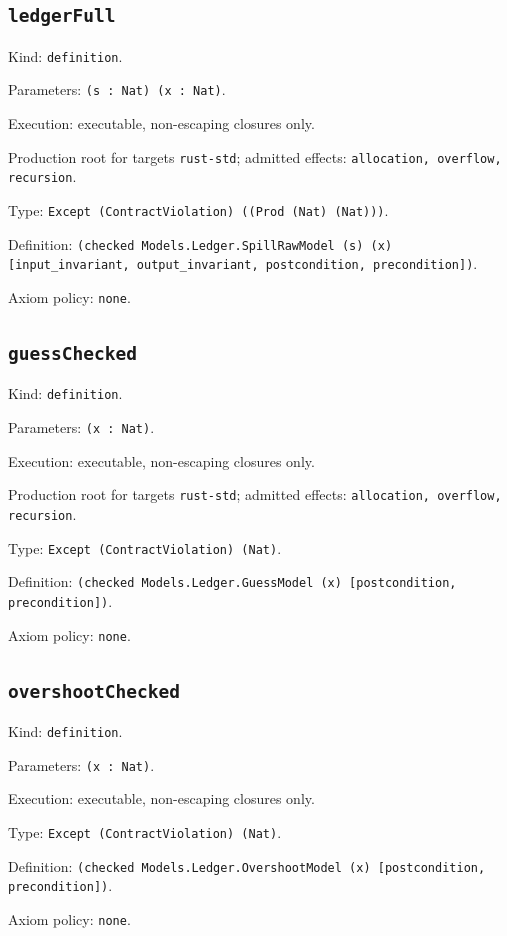 \documentclass[11pt]{article}
\begin{document}
\subsection*{\texttt{ledgerFull}}
\noindent Kind: \texttt{definition}.\par
\noindent Parameters: \texttt{(s : Nat) (x : Nat)}.\par
\noindent Execution: executable, non-escaping closures only.\par
\noindent Production root for targets \texttt{rust-std}; admitted effects: \texttt{allocation, overflow, recursion}.\par
\noindent Type: \texttt{Except (ContractViolation) ((Prod (Nat) (Nat)))}.\par
\noindent Definition: \texttt{(checked Models.Ledger.SpillRawModel (s) (x) [input\_invariant, output\_invariant, postcondition, precondition])}.\par
\noindent Axiom policy: \texttt{none}.\par
\subsection*{\texttt{guessChecked}}
\noindent Kind: \texttt{definition}.\par
\noindent Parameters: \texttt{(x : Nat)}.\par
\noindent Execution: executable, non-escaping closures only.\par
\noindent Production root for targets \texttt{rust-std}; admitted effects: \texttt{allocation, overflow, recursion}.\par
\noindent Type: \texttt{Except (ContractViolation) (Nat)}.\par
\noindent Definition: \texttt{(checked Models.Ledger.GuessModel (x) [postcondition, precondition])}.\par
\noindent Axiom policy: \texttt{none}.\par
\subsection*{\texttt{overshootChecked}}
\noindent Kind: \texttt{definition}.\par
\noindent Parameters: \texttt{(x : Nat)}.\par
\noindent Execution: executable, non-escaping closures only.\par
\noindent Type: \texttt{Except (ContractViolation) (Nat)}.\par
\noindent Definition: \texttt{(checked Models.Ledger.OvershootModel (x) [postcondition, precondition])}.\par
\noindent Axiom policy: \texttt{none}.\par
\end{document}
